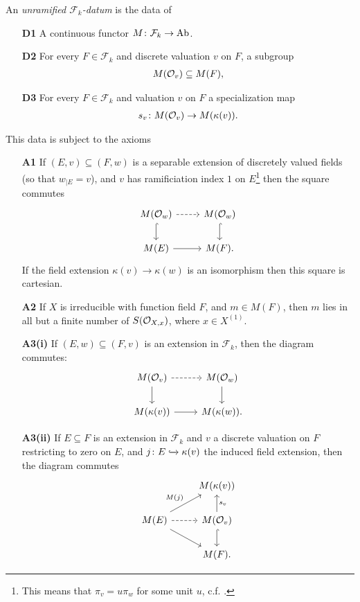 \documentclass[11pt,openany]{book}
\begin{document}
\begin{definition} \cite[2.6,2.9]{Morel}
An \textit{unramified $\mathcal{F}_k$-datum} is the data of
\begin{enumerate}
    \item[\textbf{D1}] A continuous functor $M \colon \mathcal{F}_k \to \mathrm{Ab}$.
    \item[\textbf{D2}] For every $F\in \mathcal{F}_k$ and discrete valuation $v$ on $F$, a subgroup
    \begin{align*}
        M(\mathcal{O}_v) \subseteq M(F),
    \end{align*}
    \item[\textbf{D3}] For every $F\in \mathcal{F}_k$ and valuation $v$ on $F$ a specialization map
    \begin{align*}
        s_v \colon M(\mathcal{O}_v) \to M(\kappa(v)).
    \end{align*}
\end{enumerate}
This data is subject to the axioms
\begin{enumerate}
    \item[\textbf{A1}] If $(E,v) \subseteq (F,w)$ is a separable extension of discretely valued fields (so that $w_{|E} = v$), and $v$ has ramificiation index $1$ on $E$\footnote{%
    This means that $\pi_v = u\pi_w$ for some unit $u$, c.f. \cite[09E4]{Stacks}.
    }
    then the square commutes
\[ \begin{tikzcd}
    M(\O_w)\dar[hook]\rar[dashed] & M(\O_w)\dar[hook]\\
    M(E)\rar & M(F).
\end{tikzcd} \]
If the field extension $\kappa(v) \to \kappa(w)$ is an isomorphism then this square is cartesian.

    \item[\textbf{A2}] If $X$ is irreducible with function field $F$, and $m\in M(F)$, then $m$ lies in all but a finite number of $S(\mathcal{O}_{X,x})$, where $x\in X^{(1)}$.
    \item[\textbf{A3(i)}] If $(E,w) \subseteq (F,v)$ is an extension in $\mathcal{F}_k$, then the diagram commutes:
\[ \begin{tikzcd}
    M(\mathcal{O}_v)\dar\rar[dashed] & M(\O_w)\dar\\
    M(\kappa(v))\rar & M(\kappa(w)).
\end{tikzcd} \]
    
    \item[\textbf{A3(ii)}] If $E \subseteq F$ is an extension in $\mathcal{F}_k$ and $v$ a discrete valuation on $F$ restricting to zero on $E$, and $j \colon E \xhookrightarrow{} \kappa(v)$ the induced field extension, then the diagram commutes
\[ \begin{tikzcd}
     & M(\kappa(v))\\
    M(E)\ar[ur,"M(j)" above left]\ar[dr]\rar[dashed] & M(\O_v)\dar[hook]\uar["s_v" right]\\
     & M(F).
\end{tikzcd} \]
    

\end{enumerate}
\end{definition}
\end{document}
